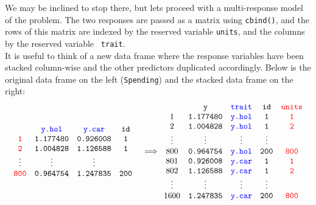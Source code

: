 \documentclass{article}
\begin{document}
 We may be inclined to stop there, but lets proceed with a multi-response model of the problem. The two responses are passed as a matrix using \texttt{cbind()}, and the rows of this matrix are indexed by the reserved variable {\color{red} \texttt{units}}, and the columns by the reserved variable \texttt{\color{blue} \texttt{trait}}.\\ 

It is useful to think of a new data frame where the response variables have been stacked column-wise and the other predictors duplicated accordingly. Below is the original data frame on the left (\texttt{Spending}) and the stacked data frame on the right:\\  

\begin{displaymath}
\begin{array}{cc}
\begin{array}{cccc}
&{\color{blue} \texttt{y.hol}}&{\color{blue} \texttt{y.car}}&\texttt{id}\\
{\color{red} \texttt{1}}&\texttt{1.177480}&\texttt{0.926008}&\texttt{1}\\
{\color{red} \texttt{2}}&\texttt{1.004828}&\texttt{1.126588}&\texttt{1}\\
\vdots&\vdots&\vdots\\
{\color{red} \texttt{800}}&\texttt{0.964754}&\texttt{1.247835}&\texttt{200}\\
\end{array}&
\Longrightarrow
\begin{array}{ccccc}
&\texttt{y}&{\color{blue} \texttt{trait}}&\texttt{id}&{\color{red} \texttt{units}}\\
1&\texttt{1.177480}&{\color{blue} \texttt{y.hol}}&\texttt{1}&{\color{red} \texttt{1}}\\
2&\texttt{1.004828}&{\color{blue} \texttt{y.hol}}&\texttt{1}&{\color{red} \texttt{2}}\\
\vdots&\vdots&\vdots&\vdots\\
800&\texttt{0.964754}&{\color{blue} \texttt{y.hol}}&\texttt{200}&{\color{red} \texttt{800}}\\
801&\texttt{0.926008}&{\color{blue} \texttt{y.car}}&\texttt{1}&{\color{red} \texttt{1}}\\
802&\texttt{1.126588}&{\color{blue} \texttt{y.car}}&\texttt{1}&{\color{red} \texttt{2}}\\
\vdots&\vdots&\vdots&\vdots\\
1600&\texttt{1.247835}&{\color{blue} \texttt{y.car}}&\texttt{200}&{\color{red} \texttt{800}}\\
\end{array}
\end{array}
\end{displaymath}
\end{document}
